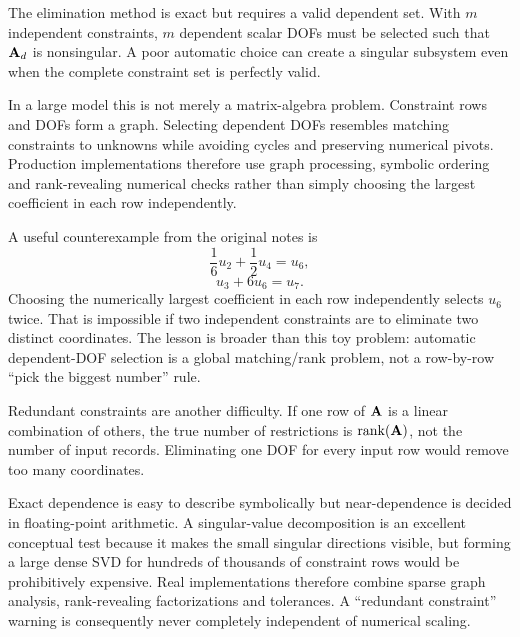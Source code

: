 The elimination method is exact but requires a valid dependent set. With $m$
independent constraints, $m$ dependent scalar DOFs must be selected such that
$\mathbf{A}_d$ is nonsingular. A poor automatic choice can create a singular
subsystem even when the complete constraint set is perfectly valid.

In a large model this is not merely a matrix-algebra problem. Constraint rows and
DOFs form a graph. Selecting dependent DOFs resembles matching constraints to
unknowns while avoiding cycles and preserving numerical pivots. Production
implementations therefore use graph processing, symbolic ordering and
rank-revealing numerical checks rather than simply choosing the largest
coefficient in each row independently.


\begin{notebooknote}
A useful counterexample from the original notes is
\begin{equation*}
    \frac{1}{6}u_2+\frac{1}{2}u_4=u_6,
\end{equation*}
\begin{equation*}
    u_3+6u_6=u_7.
\end{equation*}
Choosing the numerically largest coefficient in each row independently selects
$u_6$ twice. That is impossible if two independent constraints are to eliminate
two distinct coordinates. The lesson is broader than this toy problem: automatic
dependent-DOF selection is a global matching/rank problem, not a row-by-row
``pick the biggest number'' rule.
\end{notebooknote}

Redundant constraints are another difficulty. If one row of $\mathbf{A}$ is a linear
combination of others, the true number of restrictions is
$\operatorname{rank}(\mathbf{A})$, not the number of input records. Eliminating one
DOF for every input row would remove too many coordinates.


\begin{notebooknote}
Exact dependence is easy to describe symbolically but near-dependence is decided
in floating-point arithmetic. A singular-value decomposition is an excellent
conceptual test because it makes the small singular directions visible, but
forming a large dense SVD for hundreds of thousands of constraint rows would be
prohibitively expensive. Real implementations therefore combine sparse graph
analysis, rank-revealing factorizations and tolerances. A ``redundant constraint''
warning is consequently never completely independent of numerical scaling.
\end{notebooknote}

